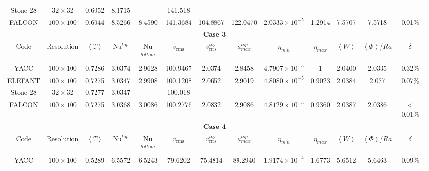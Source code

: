 \documentclass[hidelinks,10pt,a4paper]{article}
\begin{document}
\begin{table}
{\begin{tabular}{|cc|ccccccccccc|}
     \rowcolor{gray!25!}
     Stone 28 & $32\times32$ & 0.6052 & 8.1715 & - & 141.518 & - & - & - & - & - & - & - \\
     FALCON & $100\times100$ & 0.6044 & 8.5266 & 8.4590 & 141.3684 & 104.8867 & 122.0470 & $2.0333\times10^{-5}$ & 1.2914 & 7.5707 & 7.5718 & 0.01\% \\
     \midrule
     \multicolumn{13}{|c|}{\textbf{Case 3}} \\
     \midrule
     Code & Resolution & $\left\langle T \right\rangle$ & Nu$^{top}$ & Nu$^{bottom}$ & $v_{\textrm{rms}}$ & $v_{\textrm{rms}}^{top}$& $u_{max}^{top}$& $\eta_{min}$
     & $\eta_{max}$ & $\left\langle W \right\rangle$ & $\left\langle \Phi \right\rangle/Ra$ & $\delta$ \\
     \hline
     \rowcolor{gray!25!} 
     YACC & $100\times100$ & 0.7286 & 3.0374 & 2.9628 & 100.9467 & 2.0374 & 2.8458 & $4.7907\times10^{-5}$ & 1 & 2.0400 & 2.0335 & 0.32\% \\
      ELEFANT & $100\times100$ & 0.7275 & 3.0347 & 2.9908 & 100.1208 & 2.0652 & 2.9019 & $4.8080\times10^{-5}$ & 0.9023 & 2.0384 & 2.037 & 0.07\% \\
      \rowcolor{gray!25!}
      Stone 28 & $32\times32$ & 0.7277 & 3.0347 & - & 100.018 & - & - & - & - & - & - & - \\
      FALCON & $100\times100$ & 0.7275 & 3.0368 & 3.0086 & 100.2776 & 2.0832 & 2.9086 & $4.8129\times10^{-5}$ & 0.9360 & 2.0387 & 2.0386 & $<$0.01\% \\
      \midrule
      \multicolumn{13}{|c|}{\textbf{Case 4}} \\
      \midrule
      Code & Resolution & $\left\langle T \right\rangle$ & Nu$^{top}$ & Nu$^{bottom}$ & $v_{\textrm{rms}}$ & $v_{\textrm{rms}}^{top}$& $u_{max}^{top}$& $\eta_{min}$
      & $\eta_{max}$ & $\left\langle W \right\rangle$ & $\left\langle \Phi \right\rangle/Ra$ & $\delta$ \\
      \hline
      \rowcolor{gray!25!} 
      YACC & $100\times100$ & 0.5289 & 6.5572 & 6.5243 & 79.6202 & 75.4814 & 89.2940 & $1.9174\times10^{-4}$ & 1.6773 & 5.6512 & 5.6463 & 0.09\% \\

\end{tabular}}
\end{table}
\end{document}

